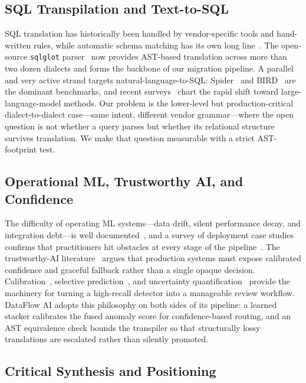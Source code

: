 \documentclass{ieeeaccess}
\begin{document}
\subsection{SQL Transpilation and Text-to-SQL}

SQL translation has historically been handled by vendor-specific tools and
hand-written rules, while automatic schema matching has its own long
line~\cite{rahm2001survey}. The open-source \texttt{sqlglot}
parser~\cite{mao2024sqlglot} now provides AST-based translation across more than
two dozen dialects and forms the backbone of our migration pipeline. A parallel
and very active strand targets natural-language-to-SQL: Spider~\cite{yu2018spider}
and BIRD~\cite{li2023bird} are the dominant benchmarks, and recent
surveys~\cite{katsogiannis2023survey, liu2024survey} chart the rapid shift toward
large-language-model methods. Our problem is the lower-level but
production-critical dialect-to-dialect case---same intent, different vendor
grammar---where the open question is not whether a query parses but whether its
relational structure survives translation. We make that question measurable with
a strict AST-footprint test.

\subsection{Operational ML, Trustworthy AI, and Confidence}

The difficulty of operating ML systems---data drift, silent performance decay,
and integration debt---is well documented~\cite{sculley2015hidden}, and a survey
of deployment case studies confirms that practitioners hit obstacles at every
stage of the pipeline~\cite{paleyes2022challenges}. The trustworthy-AI
literature~\cite{kaur2023trustworthy, li2023trustworthy} argues that production
systems must expose calibrated confidence and graceful fallback rather than a
single opaque decision. Calibration~\cite{guo2017calibration}, selective
prediction~\cite{geifman2017selective}, and uncertainty
quantification~\cite{guo2021reliability} provide the machinery for turning a
high-recall detector into a manageable review workflow. DataFlow AI adopts this
philosophy on both sides of its pipeline: a learned stacker calibrates the fused
anomaly score for confidence-based routing, and an AST equivalence check bounds
the transpiler so that structurally lossy translations are escalated rather than
silently promoted.

\subsection{Critical Synthesis and Positioning}
\end{document}
